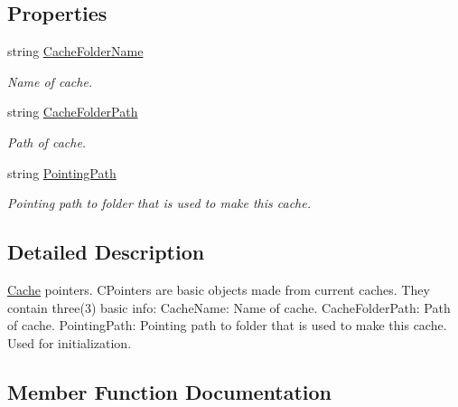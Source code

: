 \subsection*{Properties}
\begin{DoxyCompactItemize}
\item 
string \mbox{\hyperlink{classOSML_1_1Cache_1_1CPointer_a725810a1cdac6f0c5e94fa248dbe5a82}{Cache\+Folder\+Name}}
\begin{DoxyCompactList}\small\item\em Name of cache. \end{DoxyCompactList}\item 
string \mbox{\hyperlink{classOSML_1_1Cache_1_1CPointer_a179249a806f093356202c2f5bf1220bb}{Cache\+Folder\+Path}}
\begin{DoxyCompactList}\small\item\em Path of cache. \end{DoxyCompactList}\item 
string \mbox{\hyperlink{classOSML_1_1Cache_1_1CPointer_a1d8b38fb53635653e55f4745d851bd92}{Pointing\+Path}}
\begin{DoxyCompactList}\small\item\em Pointing path to folder that is used to make this cache. \end{DoxyCompactList}\end{DoxyCompactItemize}


\subsection{Detailed Description}
\mbox{\hyperlink{namespaceOSML_1_1Cache}{Cache}} pointers. C\+Pointers are basic objects made from current caches. They contain three(3) basic info\+: Cache\+Name\+: Name of cache. Cache\+Folder\+Path\+: Path of cache. Pointing\+Path\+: Pointing path to folder that is used to make this cache. Used for initialization. 



\subsection{Member Function Documentation}
\mbox{\label{classOSML_1_1Cache_1_1CPointer_aeda79d16475a8f18801717b042bd6143}} 
